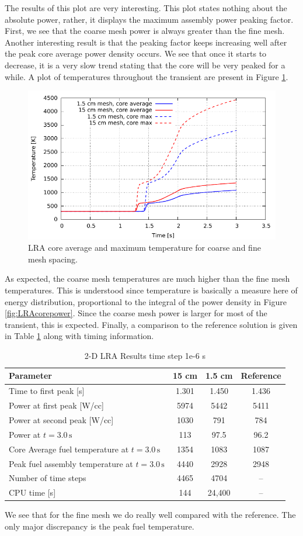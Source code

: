 \documentclass{ansconf}
\numberwithin{equation}{section}
\begin{document}
The results of this plot are very interesting. This plot states nothing about the absolute power, rather, it displays the maximum assembly power peaking factor. First, we see that the coarse mesh power is always greater than the fine mesh. Another interesting result is that the peaking factor keeps increasing well after the peak core average power density occurs. We see that once it starts to decrease, it is a very slow trend stating that the core will be very peaked for a while. A plot of temperatures throughout the transient are present in Figure \ref{fig:LRAcoretemp}.
\begin{figure}
\centering \includegraphics[scale=1.00]{./figs/LRAcoretemp.pdf}
\caption{LRA core average and maximum temperature for coarse and fine mesh spacing.}
\label{fig:LRAcoretemp}
\end{figure}
As expected, the coarse mesh temperatures are much higher than the fine mesh temperatures. This is understood since temperature is basically a measure here of energy distribution, proportional to the integral of the power density in Figure \ref{fig:LRAcorepower}. Since the coarse mesh power is larger for most of the transient, this is expected. Finally, a comparison to the reference solution is given in Table \ref{tab:LRAresults} along with timing information.
\begin{table}
\centering
\caption{2-D LRA Results time step 1e-6 s}
\label{tab:LRAresults}
\begin{tabular}{lccc}
\toprule 
Parameter & 15 cm & 1.5 cm & Reference\tabularnewline
\midrule
\midrule 
Time to first peak {[}s{]} & 1.301 & 1.450 & 1.436\tabularnewline
\midrule 
Power at first peak {[}W/cc{]} & 5974 & 5442 & 5411\tabularnewline
\midrule 
Power at second peak {[}W/cc{]} & 1030 & 791 & 784\tabularnewline
\midrule 
Power at $t=3.0\,\mathrm{s}$ & 113 & 97.5 & 96.2\tabularnewline
\midrule 
Core Average fuel temperature at $t=3.0\,\mathrm{s}$ & 1354 & 1083 & 1087\tabularnewline
\midrule 
Peak fuel assembly temperature at $t=3.0\,\mathrm{s}$ & 4440 & 2928 & 2948\tabularnewline
\midrule
Number of time steps & 4465 & 4704 & -- \tabularnewline
\midrule
CPU time {[}s{]} & 144 & 24,400 & --\tabularnewline
\bottomrule
\end{tabular}
\end{table}
We see that for the fine mesh we do really well compared with the reference. The only major discrepancy is the peak fuel temperature.
\end{document}
